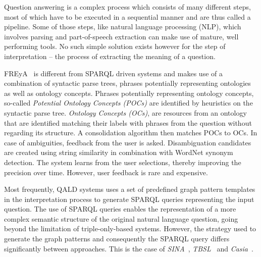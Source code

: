 Question answering is a complex process which consists of many different steps, most of which have to be executed in a sequential manner and are thus called a pipeline.
Some of those steps, like natural language processing (NLP), which involves parsing and part-of-speech extraction can make use of mature, well performing tools.
No such simple solution exists however for the step of interpretation -- the process of extracting the meaning of a question.


FREyA~\cite{freya} is different from SPARQL driven systems and makes use of a combination of syntactic parse trees, phrases potentially representing ontologies as well as ontology concepts.
Phrases potentially representing ontology concepts, so-called \emph{Potential Ontology Concepts (POCs)} are identified by heuristics on the syntactic parse tree.
\emph{Ontology Concepts (OCs)}, are resources from an ontology that are identified matching their labels with phrases from the question without regarding its structure.
A consolidation algorithm then matches POCs to OCs.
In case of ambiguities, feedback from the user is asked.
Disambiguation candidates are created using string similarity in combination with WordNet synonym detection.
The system learns from the user selections, thereby improving the precision over time.
However, user feedback is rare and expensive.

Most frequently, QALD systems uses a set of predefined graph pattern templates in the interpretation process to generate SPARQL queries representing the input question.
The use of SPARQL queries enables the representation of a more complex semantic structure of the original natural language question,
going beyond the limitation of triple-only-based systems.
However, the strategy used to generate the graph patterns and consequently the SPARQL query differs significantly between approaches.
This is the case of \emph{SINA}~\cite{SHE+13}, \emph{TBSL}~\cite{unger2012template} and \emph{Casia}~\cite{clef2013casia}.

